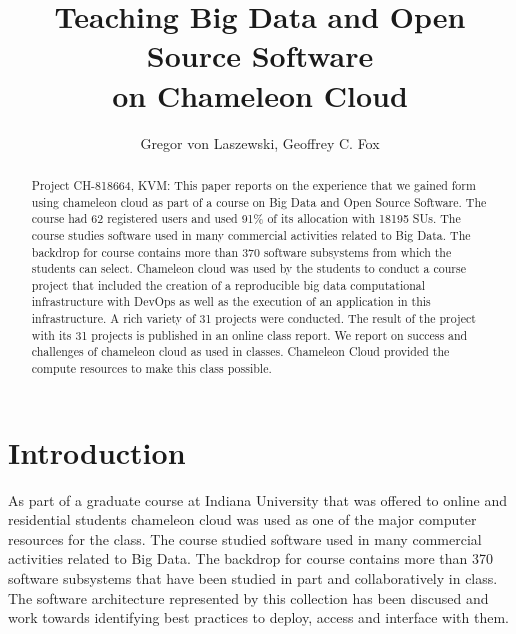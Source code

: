 \documentclass[sigconf]{acmart}
\begin{document}
\title{Teaching Big Data and Open Source Software\\
  on Chameleon Cloud}


\author{Gregor von Laszewski, Geoffrey C. Fox}


\begin{abstract}
  Project CH-818664, KVM: This paper reports on the experience that we
  gained form using chameleon cloud as part of a course on Big Data
  and Open Source Software. The course had 62 registered users and
  used 91\% of its allocation with 18195 SUs. The course studies
  software used in many commercial activities related to Big Data. The
  backdrop for course contains more than 370 software subsystems from
  which the students can select. Chameleon cloud was used by the
  students to conduct a course project that included the creation of a
  reproducible big data computational infrastructure with DevOps as
  well as the execution of an application in this infrastructure. A
  rich variety of 31 projects were conducted. The result of the
  project with its 31 projects is published in an online class
  report. We report on success and challenges of chameleon cloud as
  used in classes. Chameleon Cloud provided the compute resources to
  make this class possible.
\end{abstract}



\maketitle

\section{Introduction}

As part of a graduate course at Indiana University that was offered to
online and residential students chameleon cloud was used as one of the
major computer resources for the class. The course studied software
used in many commercial activities related to Big Data. The backdrop
for course contains more than 370 software subsystems that have been
studied in part and collaboratively in class. The software
architecture represented by this collection has been discused and work
towards identifying best practices to deploy, access and interface
with them.
\end{document}
